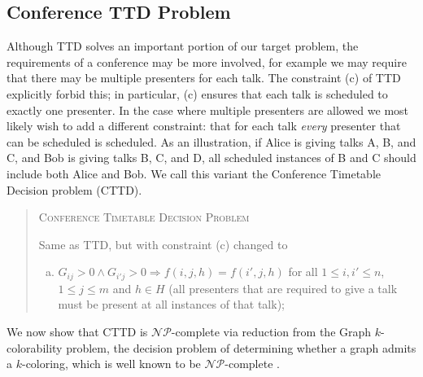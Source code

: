 \documentclass[]{article}
\theoremstyle{definition}
\theoremstyle{remark}
\numberwithin{equation}{section}
\newcommand{\cNP}{$\mathcal{NP}$}
\begin{document}
\subsection{Conference TTD Problem}
Although TTD solves an important portion of our target problem, the requirements of a conference may be more involved, for example we may require that there may be multiple presenters for each talk. 
The constraint (c) of TTD explicitly forbid this; in particular, (c) ensures that each talk is scheduled to exactly one presenter. 
In the case where multiple presenters are allowed we most likely wish to add a different constraint: that for each talk \emph{every} presenter that can be scheduled is scheduled. 
As an illustration, if Alice is giving talks A, B, and C, and Bob is giving talks B, C, and D, all scheduled instances of B and C should include both Alice and Bob. 
We call this variant the Conference Timetable Decision problem (CTTD).
\begin{quote}
	\textsc{Conference Timetable Decision Problem}
	
	Same as TTD, but with constraint (c) changed to
	\begin{enumerate}[(c)]
		\item $G_{ij} > 0 \land G_{i'j} > 0 \Rightarrow f(i,j,h)=f(i',j,h)$ for all $1 \le i,i' \le n$, $1 \le j \le m$ and $h \in H$ (all presenters that are required to give a talk must be present at all instances of that talk);
	\end{enumerate}
\end{quote}

We now show that CTTD is \cNP-complete via reduction from the Graph $k$-colorability problem, the decision problem of determining whether a graph admits a $k$-coloring, which is well known to be \cNP-complete \cite{garey76_2}.
\end{document}
